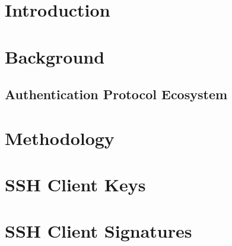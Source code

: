\documentclass[sigconf]{acmart}
\begin{document}

\maketitle

\section{Introduction}



\section{Background}


\subsection{Authentication Protocol Ecosystem}


\section{Methodology}


\section{SSH Client Keys}


\section{SSH Client Signatures}

\end{document}
